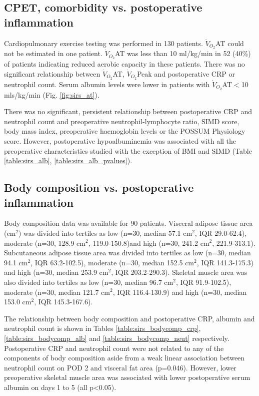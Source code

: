 \subsection{CPET, comorbidity vs. postoperative inflammation}
Cardiopulmonary exercise testing was performed in 130 patients. 
$\dot{V}_{O_2}$AT could not be estimated in one patient.
$\dot{V}_{O_2}$AT was less than 10 ml/kg/min in 52 (40\%) of patients indicating reduced aerobic capacity in these patients.
There was no significant relationship between $\dot{V}_{O_2}$AT, $\dot{V}_{O_2}$Peak and postoperative CRP or neutrophil count. 
Serum albumin levels were lower in patients with $\dot{V}_{O_2}$AT$<$10 mls/kg/min (Fig. \ref{fig:sirs_at}).

There was no significant, persistent relationship between postoperative CRP and neutrophil count and preoperative neutrophil-lymphocyte ratio, SIMD score, body mass index, preoperative haemoglobin levels or the POSSUM Physiology score. 
However, postoperative hypoalbuminemia was associated with all the preoperative characteristics studied with the exception of BMI and SIMD (Table \ref{table:sirs_alb}, \ref{table:sirs_alb_pvalues}).

\subsection{Body composition vs. postoperative inflammation}
Body composition data was available for 90 patients.
Visceral adipose tissue area (cm$^2$) was divided into tertiles as low (n=30, median 57.1 cm$^2$, IQR 29.0-62.4), moderate (n=30, 128.9 cm$^2$, 119.0-150.8)and high (n=30, 241.2 cm$^2$, 221.9-313.1). 
Subcutaneous adipose tissue area was divided into tertiles as low (n=30, median 94.1 cm$^2$, IQR 63.2-102.5), moderate (n=30, median 152.5 cm$^2$, IQR 141.3-175.3) and high (n=30, median 253.9 cm$^2$, IQR 203.2-290.3).
Skeletal muscle area was also divided into tertiles as low (n=30, median 96.7 cm$^2$, IQR 91.9-102.5), moderate (n=30, median 121.7 cm$^2$, IQR 116.4-130.9) and high (n=30, median 153.0 cm$^2$, IQR 145.3-167.6).

The relationship between body composition and postoperative CRP, albumin and neutrophil count is shown in Tables \ref{table:sirs_bodycomp_crp}, \ref{table:sirs_bodycomp_alb} and \ref{table:sirs_bodycomp_neut} respectively.
Postoperative CRP and neutrophil count were not related to any of the components of body composition aside from a weak linear association between neutrophil count on POD 2 and visceral fat area (p=0.046).
However, lower preoperative skeletal muscle area was associated with lower postoperative serum albumin on days 1 to 5 (all p<0.05).

